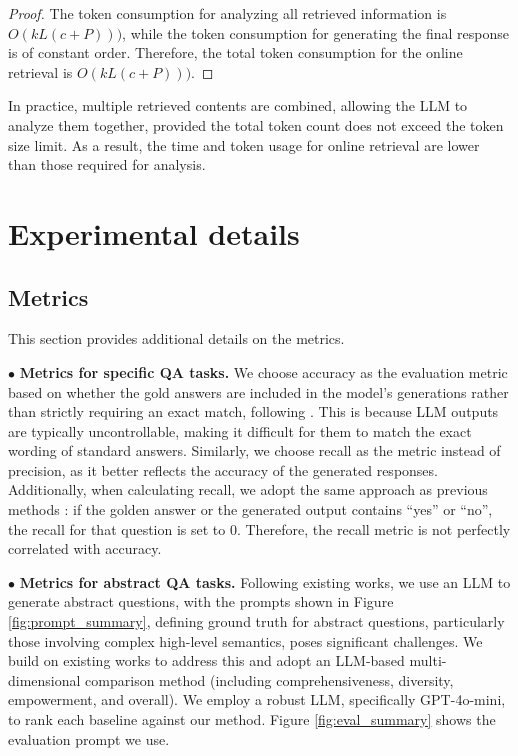 \begin{proof}
    The token consumption for analyzing all retrieved information is $O(kL(c+P)))$, while the token consumption for generating the final response is of constant order. Therefore, the total token consumption for the online retrieval is $O(kL(c+P)))$.
\end{proof}

In practice, multiple retrieved contents are combined, allowing the LLM to analyze them together, provided the total token count does not exceed the token size limit. 
% 
As a result, the time and token usage for online retrieval are lower than those required for analysis.

\section{Experimental details}



\subsection{Metrics}
\label{sec:metrics}

This section provides additional details on the metrics.

$\bullet$ \textbf{Metrics for specific QA tasks. } We choose accuracy as the evaluation metric based on whether the gold answers are included in the model's generations rather than strictly requiring an exact match, following \cite{schick2024toolformer,mallen2022not,asai2023self}.
% 
This is because LLM outputs are typically uncontrollable, making it difficult for them to match the exact wording of standard answers.
% 
Similarly, we choose recall as the metric instead of precision, as it better reflects the accuracy of the generated responses.
% 
Additionally, when calculating recall, we adopt the same approach as previous methods \cite{gutierrez2024hipporag,asai2023self}: if the golden answer or the generated output contains ``yes'' or ``no'', the recall for that question is set to 0. 
% 
Therefore, the recall metric is not perfectly correlated with accuracy.

$\bullet$ \textbf{Metrics for abstract QA tasks. }
% 
Following existing works, we use an LLM to generate abstract questions, with the prompts shown in Figure \ref{fig:prompt_summary}, defining ground truth for abstract questions, particularly those involving complex high-level semantics, poses significant challenges.
% 
We build on existing works \cite{edge2024local,guo2024lightrag} to address this and adopt an LLM-based multi-dimensional comparison method (including comprehensiveness, diversity, empowerment, and overall).
% 
We employ a robust LLM, specifically GPT-4o-mini, to rank each baseline against our method.
% 
Figure \ref{fig:eval_summary} shows the evaluation prompt we use.



